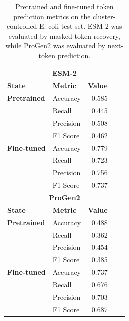 \begin{table}[t]
\centering
\caption{Pretrained and fine-tuned token prediction metrics on the cluster-controlled E. coli test set. ESM-2 was evaluated by masked-token recovery, while ProGen2 was evaluated by next-token prediction.}
\label{tab:ecoli_token_prediction_metrics_cluster95}
\begin{tabular}{llrrr}
\hline
\multicolumn{5}{c}{\textbf{ESM-2}} \\
\hline
\textbf{State} & \textbf{Metric} & \textbf{Value} & & \\
\hline
\textbf{Pretrained} & Accuracy  & 0.585 & & \\
 & Recall    & 0.445 & & \\
 & Precision & 0.508 & & \\
 & F1 Score  & 0.462 & & \\
\hline
\textbf{Fine-tuned} & Accuracy  & 0.779 & & \\
 & Recall    & 0.723 & & \\
 & Precision & 0.756 & & \\
 & F1 Score  & 0.737 & & \\
\hline
\multicolumn{5}{c}{\textbf{ProGen2}} \\
\hline
\textbf{State} & \textbf{Metric} & \textbf{Value} & & \\
\hline
\textbf{Pretrained} & Accuracy  & 0.488 & & \\
 & Recall    & 0.362 & & \\
 & Precision & 0.454 & & \\
 & F1 Score  & 0.385 & & \\
\hline
\textbf{Fine-tuned} & Accuracy  & 0.737 & & \\
 & Recall    & 0.676 & & \\
 & Precision & 0.703 & & \\
 & F1 Score  & 0.687 & & \\
\hline
\end{tabular}
\end{table}
